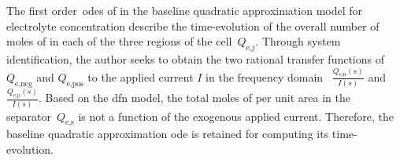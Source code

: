 
The                  first                 order~\glspl{ode}                  of
 in the baseline
quadratic  approximation  model  for   electrolyte  concentration  describe  the
time-evolution of the overall number of moles  of  in each of the three
regions of the cell~$Q_{\text{e,}j}$.  Through system identification, the author
seeks  to  obtain  the  two  rational  transfer  functions  of~$Q_\text{e,neg}$
and  $Q_\text{e,pos}$  to  the  applied  current $I$  in  the  frequency  domain
\ie~$\frac{Q_\text{e,n}(s)}{I(s)}$ and~$\frac{Q_\text{e,p}(s)}{I(s)}$. Based on
the  \gls{dfn}  model,  the total  moles  of    per  unit area  in  the
separator~$Q_\text{e,s}$  is not a  function of the exogenous  applied current.
Therefore,  the  baseline  quadratic  approximation \gls{ode}  is  retained  for
computing its time-evolution.

